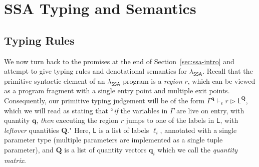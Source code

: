 \documentclass[acmsmall,screen,anonymous,review]{acmart}
\newcommand{\mc}[1]{\ensuremath{\mathcal{#1}}}
\newcommand{\mb}[1]{\ensuremath{\mathbf{#1}}}
\newcommand{\ms}[1]{\ensuremath{\mathsf{#1}}}
\newcommand{\hasty}[4]{#1 \vdash_{#2} #3: {#4}}
\newcommand{\haslb}[4]{#1 \vdash_{#2} #3 \rhd #4}
\newcommand{\teqv}{\approx}
\newcommand{\tref}{\twoheadrightarrow}
\newcommand{\tmle}[5]{#1 \vdash_{#2} #3 \tref #4 : {#5}}
\newcommand{\tmeq}[5]{#1 \vdash_{#2} #3 \teqv #4 : {#5}}
\newcommand{\dnt}[1]{\llbracket{#1}\rrbracket}
\newcommand{\isotopessa}{\(\lambda_{\ms{SSA}}\)}
\begin{document}

\section{SSA Typing and Semantics}

\subsection{Typing Rules}

We now turn back to the promises at the end of Section~\ref{sec:ssa-intro} and attempt to give 
typing rules and denotational semantics for \isotopessa{}. Recall that the primitive syntactic 
element of an \isotopessa{} program is a \emph{region} $r$, which can be viewed as a program 
fragment with a single entry point and multiple exit points. Consequently, our primitive typing 
judgement will be of the form
$
  \haslb{\Gamma^{\mb{q}}}{\epsilon}{r}{\ms{L}^{\mb{Q}}}
$,
which we will read as stating  that ``\emph{if} the variables in $\Gamma$ are live on entry, with
quantity $\mb{q}$, \emph{then} executing the region $r$ jumps to one of the labels in $\ms{L}$, with
\emph{leftover} quantities $\mb{Q}$." Here, $\ms{L}$ is a list of labels $\ell_i$, annotated with a
single parameter type (multiple parameters are implemented as a single tuple parameter), and
$\mb{Q}$ is a list of quantity vectors $\mb{q}_i$ which we call the \emph{quantity matrix}.
\end{document}
